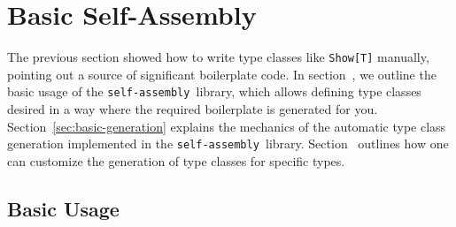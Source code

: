\documentclass[preprint]{sigplanconf}
\newcommand{\selfassembly}{\texttt{self-assembly~}}
\begin{document}
\begin{comment}



\end{comment}


\section{Basic Self-Assembly}
\label{sec:basic-self-assembly}


The previous section showed how to write type classes like \verb|Show[T]|
manually, pointing out a source of significant boilerplate code. In
section~\cite{sec:basic-usage}, we outline the basic usage of the
\selfassembly library, which allows defining type classes desired in a way
where the required boilerplate is generated for you.
Section~\ref{sec:basic-generation} explains the mechanics of the automatic
type class generation implemented in the \selfassembly library.
Section~\cite{sec:customization} outlines how one can customize the generation
of type classes for specific types.

\subsection{Basic Usage}
\label{sec:basic-usage}
\end{document}
